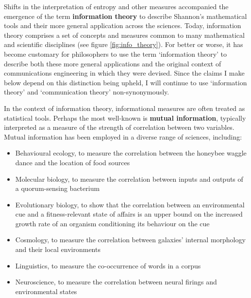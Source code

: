 Shifts in the interpretation of entropy and other measures accompanied the emergence of the term \textbf{information theory} to describe Shannon's mathematical tools and their more general application across the sciences.
Today, information theory comprises a set of concepts and measures common to many mathematical and scientific disciplines (see figure \ref{fig:info_theory}).
For better or worse, it has become customary for philosophers to use the term `information theory' to describe both these more general applications and the original context of communications engineering in which they were devised.
Since the claims I make below depend on this distinction being upheld, I will continue to use `information theory' and `communication theory' non-synonymously.



In the context of information theory, informational measures are often treated as statistical tools.
Perhaps the most well-known is \textbf{mutual information}, typically interpreted as a measure of the strength of correlation between two variables.
Mutual information has been employed in a diverse range of sciences, including:

\begin{itemize}
    \item Behavioural ecology, to measure the correlation between the honeybee waggle dance and the location of food sources \citep{haldane1954statistical}
    \item Molecular biology, to measure the correlation between inputs and outputs of a quorum-sensing bacterium \citep{mehta2009information}
    \item Evolutionary biology, to show that the correlation between an environmental cue and a fitness-relevant state of affairs is an upper bound on the increased growth rate of an organism conditioning its behaviour on the cue \citep{donaldson-matasci2010fitness}
    \item Cosmology, to measure the correlation between galaxies' internal morphology and their local environments \citep{pandey2017how}
    \item Linguistics, to measure the co-occurrence of words in a corpus \citep[$\S$4]{hunston2002corpora}
    \item Neuroscience, to measure the correlation between neural firings and environmental states \citep[][and references therein]{rathkopf2017neural}
\end{itemize}

